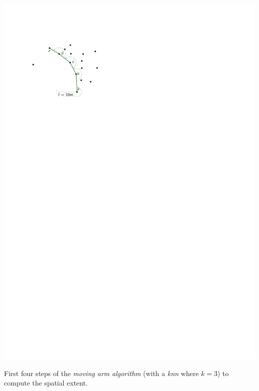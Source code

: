 \begin{marginfigure}
  \centering
  \includegraphics[page=2,width=\textwidth]{figs/movingarm.pdf}
  \caption{First four steps of the \emph{moving arm algorithm} (with a \emph{knn} where $k=3$) to compute the spatial extent.}%
\end{marginfigure}

